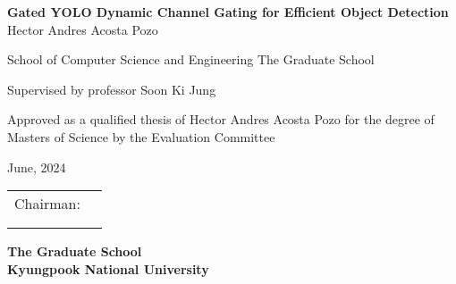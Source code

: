 \begin{titlepage}
    \begin{center}
        \textbf{\huge Gated YOLO Dynamic Channel Gating for Efficient Object Detection \newline}  
        \textnormal{\Large Hector Andres Acosta Pozo}
        
        
        \textnormal{\large School of Computer Science and Engineering\newline}
        \textnormal{\large The Graduate School} 
        
        \textnormal{\large Supervised by professor Soon Ki Jung}
        
        \textnormal{\large Approved as a qualified thesis of Hector Andres Acosta Pozo \newline }
        \textnormal{\large for the degree of Masters of Science\newline}
        \textnormal{\large by the Evaluation Committee \newline}
        
        \textnormal{\large June, 2024}
        
        \begin{flushright}
        	\begin{tabular}{cl}
            \textnormal{Chairman}:	    & \underline{\makebox[2in][l]{Prof. Koh Seok-ju}}\\ 
             							& \underline{\makebox[2in][l]{Prof. Jung Soon-ki}}\\  
             							& \underline{\makebox[2in][l]{Prof. Kim Yong-tae}}\\ 
                                                                                
            \end{tabular}
        \end{flushright}
        \vfill 
        
       \textbf{\Large The Graduate School \\ Kyungpook National University}
        \vfill               
    \end{center}
\end{titlepage}